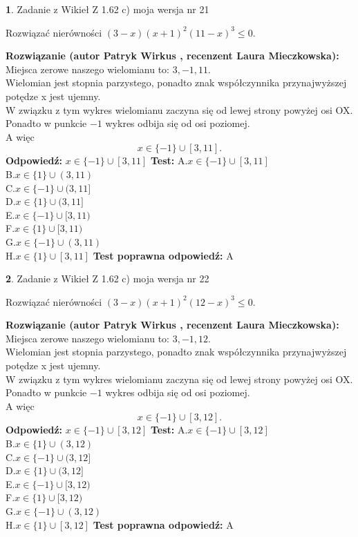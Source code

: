 \documentclass[12pt, a4paper]{article}
\theoremstyle{definition} %
\newtheorem{zad}{}
\newcommand{\zadStart}[1]{\begin{zad}#1\newline}
\newcommand{\zadStop}{\end{zad}}
\newcommand{\rozwStart}[2]{\noindent \textbf{Rozwiązanie (autor #1 , recenzent #2): }\newline}
\newcommand{\rozwStop}{\newline}
\newcommand{\odpStart}{\noindent \textbf{Odpowiedź:}\newline}
\newcommand{\odpStop}{\newline}
\newcommand{\testStart}{\noindent \textbf{Test:}\newline}
\newcommand{\testStop}{\newline}
\newcommand{\kluczStart}{\noindent \textbf{Test poprawna odpowiedź:}\newline}
\newcommand{\kluczStop}{\newline}
\begin{document}
\zadStart{Zadanie z Wikieł Z 1.62 c) moja wersja nr 21}

Rozwiązać nierówności $(3-x)(x+1)^{2}(11-x)^{3}\le0$.
\zadStop
\rozwStart{Patryk Wirkus}{Laura Mieczkowska}
Miejsca zerowe naszego wielomianu to: $3, -1, 11$.\\
Wielomian jest stopnia parzystego, ponadto znak współczynnika przy\linebreak najwyższej potędze x jest ujemny.\\ W związku z tym wykres wielomianu zaczyna się od lewej strony powyżej osi OX.\\
Ponadto w punkcie $-1$ wykres odbija się od osi poziomej.\\
A więc $$x \in \{-1\} \cup [3,11].$$
\rozwStop
\odpStart
$x \in \{-1\} \cup [3,11]$
\odpStop
\testStart
A.$x \in \{-1\} \cup [3,11]$\\
B.$x \in \{1\} \cup (3,11)$\\
C.$x \in \{-1\} \cup (3,11]$\\
D.$x \in \{1\} \cup (3,11]$\\
E.$x \in \{-1\} \cup [3,11)$\\
F.$x \in \{1\} \cup [3,11)$\\
G.$x \in \{-1\} \cup (3,11)$\\
H.$x \in \{1\} \cup [3,11]$
\testStop
\kluczStart
A
\kluczStop



\zadStart{Zadanie z Wikieł Z 1.62 c) moja wersja nr 22}

Rozwiązać nierówności $(3-x)(x+1)^{2}(12-x)^{3}\le0$.
\zadStop
\rozwStart{Patryk Wirkus}{Laura Mieczkowska}
Miejsca zerowe naszego wielomianu to: $3, -1, 12$.\\
Wielomian jest stopnia parzystego, ponadto znak współczynnika przy\linebreak najwyższej potędze x jest ujemny.\\ W związku z tym wykres wielomianu zaczyna się od lewej strony powyżej osi OX.\\
Ponadto w punkcie $-1$ wykres odbija się od osi poziomej.\\
A więc $$x \in \{-1\} \cup [3,12].$$
\rozwStop
\odpStart
$x \in \{-1\} \cup [3,12]$
\odpStop
\testStart
A.$x \in \{-1\} \cup [3,12]$\\
B.$x \in \{1\} \cup (3,12)$\\
C.$x \in \{-1\} \cup (3,12]$\\
D.$x \in \{1\} \cup (3,12]$\\
E.$x \in \{-1\} \cup [3,12)$\\
F.$x \in \{1\} \cup [3,12)$\\
G.$x \in \{-1\} \cup (3,12)$\\
H.$x \in \{1\} \cup [3,12]$
\testStop
\kluczStart
A
\kluczStop
\end{document}
